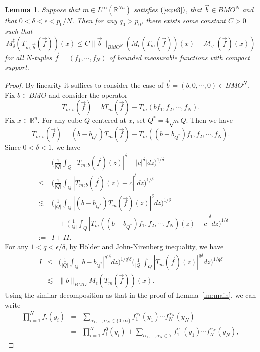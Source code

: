 \documentclass[11pt,oneside,onecolumn]{amsart}
\numberwithin{equation}{section}
\newtheorem{Lemma}[Theorem]{Lemma}
\begin{document}
\begin{Lemma}\label{lm:main1}
Suppose that $m\in L^\infty({\mathbb{R}}^{Nn})$ satisfies $(\ref{eq:e3})$, that $\vec{b}\in BMO^N$ and that $0<\delta<\epsilon<p_0/N$. Then for
any $q_0>p_0$, there exists some constant $C>0$ such that
\[
  M_\delta^\sharp (T_{m;\vec{b}}(\vec{f}))(x)\le C\|\vec{b}\|_{BMO^N}(M_\epsilon(T_m(\vec{f}))(x)+ \mathcal{M}_{q_0}(\vec{f})(x))
\]
for all $N$-tuples $\vec{f}=(f_1,\cdots,f_N)$ of bounded measurable functions with compact support.
\end{Lemma}
\begin{proof}
By linearity it suffices to consider the case of $\vec{b}=(b,0,\cdots,0)\in BMO^N$. Fix $b\in BMO$ and
consider the operator
\[
  T_{m;b}(\vec{f})=bT_m(\vec{f})-T_m(bf_1,f_2,\cdots,f_N).
\]
Fix $x\in{\mathbb{R}}^n$. For any cube $Q$ centered at $x$, set $Q^*=4\sqrt{n}Q$. Then we have
\[
   T_{m;b}(\vec{f})=(b-b_{Q^*})T_m(\vec{f})-T_m((b-b_{Q^*})f_1,f_2,\cdots,f_N).
\]
Since $0<\delta<1$, we have
\begin{eqnarray*}
&&\bigg(\frac{1}{|Q|}\int_Q \bigg||T_{m;b}(\vec{f})(z)|^\delta -|c|^\delta\bigg|dz\bigg)^{1/\delta}\\
&\le& \bigg(\frac{1}{|Q|}\int_Q |T_{m;b}(\vec{f})(z) -c|^\delta dz\bigg)^{1/\delta}\\
&\lesssim&\bigg(\frac{1}{|Q|}\int_Q |(b-b_{Q^*})T_m(\vec{f})(z)|^\delta dz\bigg)^{1/\delta}\\
&&\quad+\bigg(\frac{1}{|Q|}\int_Q |T_m((b-b_{Q^*})f_1,f_2,\cdots,f_N)(z) -c|^\delta dz\bigg)^{1/\delta}\\
&:=&I+II.
\end{eqnarray*}
For any $1<q<\epsilon/\delta$, by H\"{o}lder and John-Nirenberg inequality, we have
\begin{eqnarray*}
I&\le& \bigg(\frac{1}{|Q|}\int_Q |b-b_{Q^*}|^{q'\delta} dz\bigg)^{1/{q'\delta}}
       \bigg(\frac{1}{|Q|}\int_Q |T_m(\vec{f})(z)|^{q\delta} dz\bigg)^{1/{q\delta}}\\
 &\lesssim& \|b\|^{}_{BMO}M_\epsilon(T_m(\vec{f}))(x).
\end{eqnarray*}
Using the similar decomposition as that in the proof of Lemma~\ref{lm:main}, we can write
\begin{eqnarray*}
\prod_{i=1}^Nf_i(y_i)&=&\sum_{\alpha_1,\cdots,\alpha_N\in\{0,\infty\}}f_1^{\alpha_1}(y_1)\cdots f_N^{\alpha_N}(y_N)\\
&=&\prod_{i=1}^N f_i^0(y_i)+\sum_{\alpha_1,\cdots,\alpha_N\in \mathcal{I}} f_1^{\alpha_1}(y_1)\cdots f_N^{\alpha_N}(y_N),
\end{eqnarray*}

\end{proof}
\end{document}
